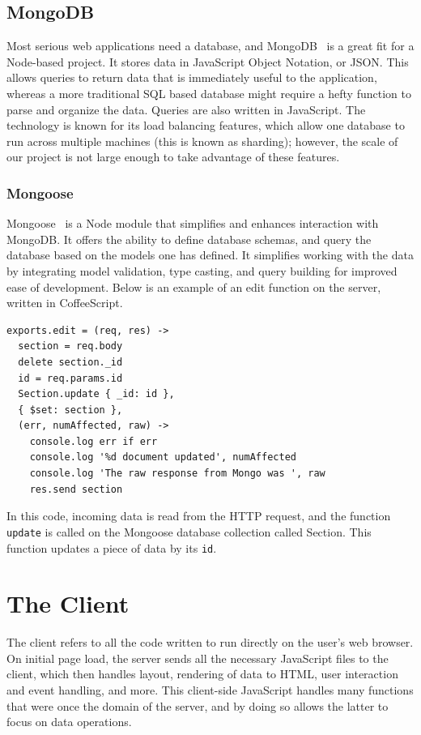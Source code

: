 \documentclass[12pt]{article}
\newcommand{\code}[1]{{\texttt {#1}}}
\begin{document}
\subsection{MongoDB}\label{sec:mongo}
Most serious web applications need a database, and MongoDB~\cite{MongoDB} is a great fit for a Node-based project. It stores data in JavaScript Object Notation, or JSON. This allows queries to return data that is immediately useful to the application, whereas a more traditional SQL based database might require a hefty function to parse and organize the data. Queries are also written in JavaScript. The technology is known for its  load balancing features, which allow one database to run across multiple machines (this is known as sharding); however, the scale of our project is not large enough to take advantage of these features.

\subsubsection{Mongoose}\label{sec:mongoose}
Mongoose~\cite{Mongoose} is a Node module that simplifies and enhances interaction with MongoDB. It offers the ability to define database schemas, and query the database based on the models one has defined. It simplifies working with the data by integrating model validation, type casting, and query building for improved ease of development. Below is an example of an edit function on the server, written in CoffeeScript.
\begin{verbatim}
exports.edit = (req, res) ->
  section = req.body
  delete section._id
  id = req.params.id
  Section.update { _id: id },
  { $set: section },
  (err, numAffected, raw) ->
    console.log err if err
    console.log '%d document updated', numAffected
    console.log 'The raw response from Mongo was ', raw
    res.send section
\end{verbatim}
In this code, incoming data is read from the HTTP request, and the function \code{update} is called on the Mongoose database collection called Section. This function updates a piece of data by its \code{id}.


\section{The Client}\label{sec:client}
The client refers to all the code written to run directly on the user's web browser. On initial page load, the server sends all the necessary JavaScript files to the client, which then handles layout, rendering of data to HTML, user interaction and event handling, and more. This client-side JavaScript handles many functions that were once the domain of the server, and by doing so allows the latter to focus on data operations.
\end{document}
